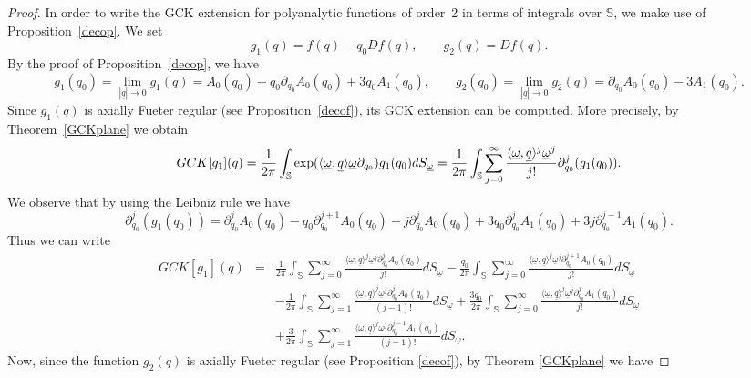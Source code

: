 \documentclass[reqno,11pt]{amsart}
\numberwithin{equation}{section}
\theoremstyle{definition}
\begin{document}
\begin{proof}
In order to write the GCK extension for polyanalytic functions of order~2 in terms of integrals over $\mathbb{S}$, we make use of Proposition~\ref{decop}. We set
$$
g_1(q) = f(q) - q_0 Df(q),
\qquad
g_2(q) = Df(q).
$$
By the proof of Proposition~\ref{decop}, we have
$$ g_1(q_0)=
\lim_{|\underline{q}| \to 0} g_1(q)
= A_0(q_0) - q_0 \partial_{q_0} A_0(q_0) + 3 q_0 A_1(q_0),
\qquad
g_2(q_0)=\lim_{|\underline{q}| \to 0} g_2(q)
= \partial_{q_0} A_0(q_0) - 3 A_1(q_0).
$$
Since $g_1(q)$ is axially Fueter regular (see Proposition~\ref{decof}), its GCK extension can be computed. More precisely, by Theorem~\ref{GCKplane} we obtain
$$ GCK[g_1](q)= \frac{1}{2 \pi} \int_{\mathbb{S}} \hbox{exp}( \langle \underline{\omega}, \underline{q} \rangle \underline{\omega} \partial_{q_0})g_1(q_0) dS_{\underline{\omega}} =\frac{1}{2 \pi} \int_{\mathbb{S}} \sum_{j=0}^\infty \frac{\langle \underline{\omega}, \underline{q} \rangle^j \underline{\omega}^j}{j!} \partial_{q_0}^j (g_1(q_0)).$$
We observe that by using the Leibniz rule we have
$$ \partial_{q_0}^j (g_1(q_0))= \partial_{q_0}^j A_0(q_0)-q_0 \partial_{q_0}^{j+1}A_0(q_0)-j \partial_{q_0}^jA_0(q_0)+3q_0 \partial_{q_0}^j A_1(q_0)+3j \partial_{q_0}^{j-1}A_1(q_0).$$
Thus we can write
\begin{eqnarray*}
\nonumber
GCK[g_1](q)&=& \frac{1}{2 \pi} \int_{\mathbb{S}} \sum_{j=0}^\infty \frac{\langle \underline{\omega}, \underline{q} \rangle^j \underline{\omega}^j \partial_{q_0}^j A_0(q_0)}{j!}dS_{\underline{\omega}}-\frac{q_0}{2 \pi} \int_{\mathbb{S}} \sum_{j=0}^\infty \frac{\langle \underline{\omega}, \underline{q} \rangle^j \underline{\omega}^j \partial_{q_0}^{j+1}A_0(q_0)}{j!}dS_{\underline{\omega}}\\
\nonumber
&&-\frac{1}{2 \pi} \int_{\mathbb{S}} \sum_{j=1}^{\infty} \frac{\langle \underline{\omega}, \underline{q} \rangle^j \underline{\omega}^j \partial_{q_0}^j A_0(q_0)}{(j-1)!}dS_{\underline{\omega}}+\frac{3 q_0}{2 \pi} \int_{\mathbb{S}} \sum_{j=0}^\infty \frac{\langle \underline{\omega}, \underline{q} \rangle^j \underline{\omega}^j \partial_{q_0}^j A_1(q_0)}{j!}dS_{\underline{\omega}}\\
\label{g1}
&&+ \frac{3}{2 \pi} \int_{\mathbb{S}} \sum_{j=1}^\infty \frac{\langle \underline{\omega}, \underline{q} \rangle^j \underline{\omega}^j \partial_{q_0}^{j-1}A_1(q_0)}{(j-1)!}dS_{\underline{\omega}}.
\end{eqnarray*}
Now, since the function $g_2(q)$ is axially Fueter regular (see Proposition \ref{decof}), by Theorem \ref{GCKplane} we have

\end{proof}
\end{document}
